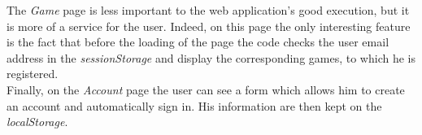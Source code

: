 \documentclass[]{article}
\begin{document}
The \textit{Game} page is less important to the web application's good execution, but it is more of a service for the user. Indeed, on this page the only interesting feature is the fact that before the loading of the page the code checks the user email address in the \textit{sessionStorage} and display the corresponding games, to which he is registered.\\
 
Finally, on the \textit{Account} page the user can see a form which allows him to create an account and automatically sign in. His information are then kept on the \textit{localStorage}. 
\end{document}
